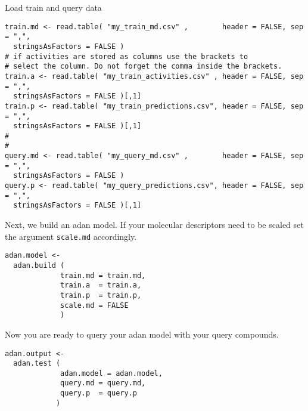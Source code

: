 \documentclass[a4paper]{article}
\begin{document}
Load train and query data

\begin{verbatim}
train.md <- read.table( "my_train_md.csv" ,        header = FALSE, sep = ",",
  stringsAsFactors = FALSE )
# if activities are stored as columns use the brackets to   
# select the column. Do not forget the comma inside the brackets.
train.a <- read.table( "my_train_activities.csv" , header = FALSE, sep = ",",
  stringsAsFactors = FALSE )[,1]  
train.p <- read.table( "my_train_predictions.csv", header = FALSE, sep = ",",
  stringsAsFactors = FALSE )[,1]    
#  
#
query.md <- read.table( "my_query_md.csv" ,        header = FALSE, sep = ",",
  stringsAsFactors = FALSE )
query.p <- read.table( "my_query_predictions.csv", header = FALSE, sep = ",",
  stringsAsFactors = FALSE )[,1]    
\end{verbatim}

Next, we build an adan model. If your molecular descriptors need to be scaled set 
the argument \texttt{scale.md} accordingly.

\begin{verbatim}
adan.model <- 
  adan.build ( 
             train.md = train.md, 
             train.a  = train.a,
             train.p  = train.p, 
             scale.md = FALSE
             )
\end{verbatim}

Now you are ready to query your adan model with your query compounds.

\begin{verbatim}
adan.output <- 
  adan.test ( 
             adan.model = adan.model,
             query.md = query.md, 
             query.p  = query.p 
            )
\end{verbatim}
\end{document}
